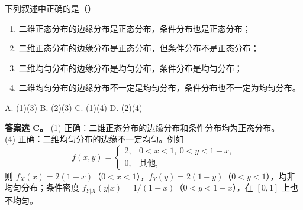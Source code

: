 \documentclass[lang=cn,11pt]{elegantbook}
\begin{document}
\begin{exercise}[二维分布的性质判断] \label{exer:3-c5b}
下列叙述中正确的是（\quad）
\begin{enumerate}
    \item[(1)] 二维正态分布的边缘分布是正态分布，条件分布也是正态分布；
    \item[(2)] 二维正态分布的边缘分布是正态分布，但条件分布不是正态分布；
    \item[(3)] 二维均匀分布的边缘分布是均匀分布，条件分布是均匀分布；
    \item[(4)] 二维均匀分布的边缘分布不一定是均匀分布，条件分布也不一定为均匀分布。
\end{enumerate}
A. (1)(3) \quad B. (2)(3) \quad C. (1)(4) \quad D. (2)(4)
\end{exercise}
\begin{solution}
\textbf{答案选 C。}
(1) 正确：二维正态分布的边缘分布和条件分布均为正态分布。\\
(4) 正确：二维均匀分布的边缘不一定均匀。例如
\[
f(x,y) = \begin{cases} 2, & 0 < x < 1,\ 0 < y < 1-x, \\ 0, & \text{其他}, \end{cases}
\]
则 $f_X(x) = 2(1-x)$（$0<x<1$），$f_Y(y) = 2(1-y)$（$0<y<1$），均非均匀分布；条件密度 $f_{Y|X}(y|x) = 1/(1-x)$（$0<y<1-x$），在 $[0,1]$ 上也不均匀。
\end{solution}
\end{document}
